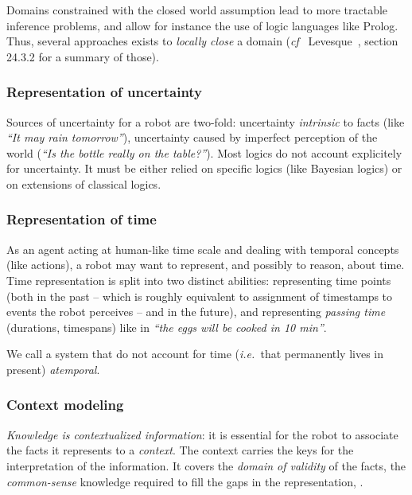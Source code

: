 \documentclass[a4paper, twocolumn]{article}
\newcommand{\ie}{{\textit{i.e.~}}}
\newcommand{\cf}{{\textit{cf~}}}
\begin{document}
Domains constrained with the closed world assumption lead to more tractable
inference problems, and allow for instance the use of logic languages like
Prolog. Thus, several approaches exists to \emph{locally close} a domain (\cf
Levesque~\cite{Levesque2008}, section 24.3.2 for a summary of those).


\subsubsection{Representation of uncertainty}

Sources of uncertainty for a robot are two-fold: uncertainty \emph{intrinsic}
to facts (like \emph{``It may rain tomorrow''}), uncertainty caused by
imperfect perception of the world (\emph{``Is the bottle really on the
table?''}). Most logics do not account explicitely for uncertainty. It must be
either relied on specific logics (like Bayesian logics) or on extensions of
classical logics.


\subsubsection{Representation of time}

As an agent acting at human-like time scale and dealing with temporal concepts
(like actions), a robot may want to represent, and possibly to reason, about
time. Time representation is split into two distinct abilities: representing
time points (both in the past -- which is roughly equivalent to assignment of
timestamps to events the robot perceives -- and in the future), and
representing \emph{passing time} (durations, timespans) like in \emph{``the
eggs will be cooked in 10 min''}.

We call a system that do not account for time (\ie that permanently lives in
present) \emph{atemporal}.


\subsubsection{Context modeling}

\emph{Knowledge is contextualized information}: it is essential for the robot to associate the facts it
represents to a \emph{context}. The context carries the keys for the
interpretation of the information. It covers the \emph{domain of validity} of
the facts, the \emph{common-sense} knowledge required to fill the gaps in the
representation, .
\end{document}
